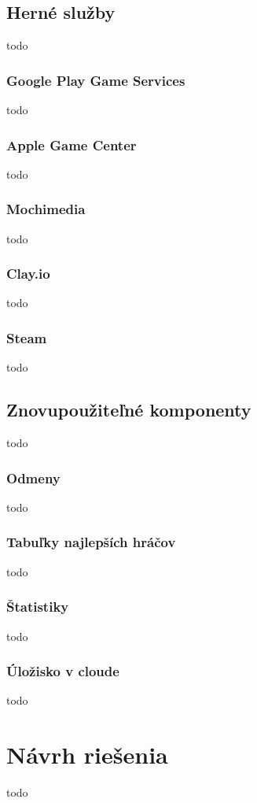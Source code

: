 \section{Herné služby}
todo

\subsection{Google Play Game Services}
todo

\subsection{Apple Game Center}
todo

\subsection{Mochimedia}
todo

\subsection{Clay.io}
todo

\subsection{Steam}
todo

\section{Znovupoužiteľné komponenty}
todo

\subsection{Odmeny}
todo

\subsection{Tabuľky najlepších hráčov}
todo

\subsection{Štatistiky}
todo

\subsection{Úložisko v cloude}
todo

\chapter{Návrh riešenia}
\label{chap:navrh}
todo

